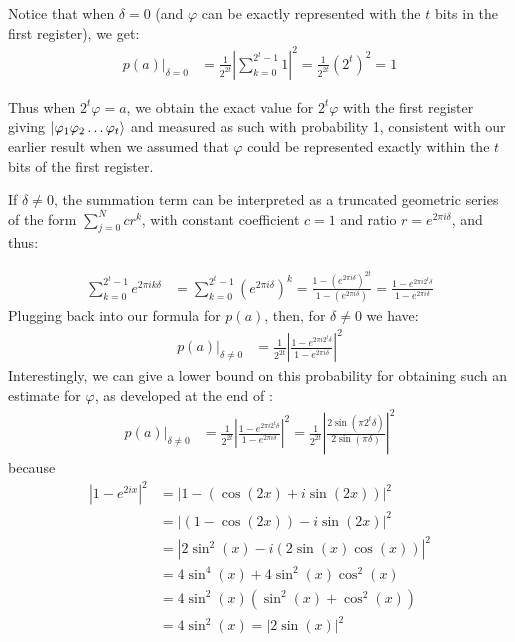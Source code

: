 \documentclass{article}
\begin{document}
\begin{enumerate}[label=\textbf{(\arabic*)}]
Notice that when $\delta=0$ (and $\varphi$ can be exactly represented with the $t$ bits in the first register), we get:
\begin{align}
    p(a)\rvert_{\delta=0}
    &=
    \frac{1}{2^{2t}}
    \left|
      \sum_{k=0}^{2^t-1}
      1
    \right|^{2}
    =
    \frac{1}{2^{2t}}(2^t)^2 = 1
\end{align}

Thus when $2^t \varphi = a$, we obtain the exact value for $2^t \varphi$ with the first register giving $\ket{\varphi_1\varphi_2\ldots\varphi_t}$ and measured as such with probability 1, consistent with our earlier result when we assumed that $\varphi$ could be represented exactly within the $t$ bits of the first register.

If $\delta\ne 0$, the summation term can be interpreted as a truncated geometric series of the form $\sum_{j=0}^{N}cr^k$, with constant coefficient $c=1$ and ratio $r = e^{2\pi i\delta}$, and thus:

\begin{align}
    \sum_{k=0}^{2^t-1} e^{2\pi i k\delta}
    &=
    \sum_{k=0}^{2^t-1} (e^{2\pi i \delta})^k
    =
    \frac{1-(e^{2\pi i \delta})^{2t}}
    {1-(e^{2\pi i \delta})}
    =
    \frac{1-e^{2\pi i 2^t \delta}}
    {1-e^{2\pi i \delta}}
\end{align}
Plugging back into our formula for $p(a)$, then, for $\delta\ne 0$ we have:
\begin{align}
    p(a)\rvert_{\delta\ne 0}
    &=
    \frac{1}{2^{2t}}
    \left|
      \frac{1-e^{2\pi i 2^t \delta}}
    {1-e^{2\pi i \delta}}
    \right|^{2}
\end{align}
Interestingly, we can give a lower bound on this probability for obtaining such an estimate for $\varphi$, as developed at the end of \cite{wikipedia:qpe}:
\begin{align}
    p(a)\rvert_{\delta\ne 0}
    &=
    \frac{1}{2^{2t}}
    \left|
      \frac{1-e^{2\pi i 2^t \delta}}
    {1-e^{2\pi i \delta}}
    \right|^{2}
    =
    \frac{1}{2^{2t}}
    \left|
      \frac{2\sin(\pi 2^t \delta)}
    {2\sin(\pi \delta)}
    \right|^2
\end{align}
because
\begin{align}
    |1 - e^{2ix}|^2
    &=
    |1 - (\cos(2x)+i\sin(2x))|^2\\
    &=
    |(1 - \cos(2x)) - i\sin(2x)|^2\\
    &=
    |2\sin^{2}(x) - i(2\sin(x)\cos(x))|^2\\
    &=
    4\sin^{4}(x) + 4\sin^{2}(x)\cos^{2}(x)\\
    &=
    4\sin^{2}(x)\left(\sin^{2}(x) + \cos^{2}(x)\right)\\
    &=
    4\sin^{2}(x) = |2\sin(x)|^2
\end{align}


\end{enumerate}
\end{document}
